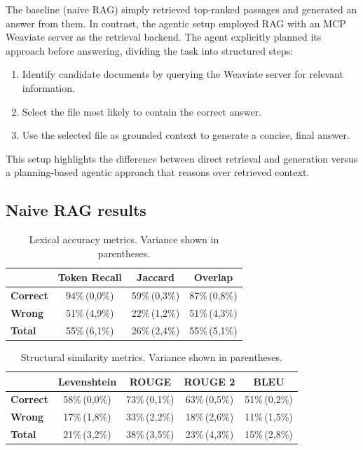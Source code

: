 The baseline (naive RAG) simply retrieved top-ranked passages and generated an answer from them. In contrast, the agentic setup employed RAG with an MCP Weaviate server as the retrieval backend. The agent explicitly planned its approach before answering, dividing the task into structured steps:  
\begin{enumerate}
  \item Identify candidate documents by querying the Weaviate server for relevant information.  
  \item Select the file most likely to contain the correct answer.  
  \item Use the selected file as grounded context to generate a concise, final answer.  
\end{enumerate}

This setup highlights the difference between direct retrieval and generation versus a planning-based agentic approach that reasons over retrieved context.
\subsection{Naive RAG results}
\begin{table}[h]
\centering
\begin{tabular}{lccc}
\hline
 & Token Recall & Jaccard & Overlap \\
\hline
\textbf{Correct} & 94\%\,(0,0\%) & 59\%\,(0,3\%) & 87\%\,(0,8\%) \\
\textbf{Wrong}   & 51\%\,(4,9\%) & 22\%\,(1,2\%) & 51\%\,(4,3\%) \\
\textbf{Total}   & 55\%\,(6,1\%) & 26\%\,(2,4\%) & 55\%\,(5,1\%) \\
\hline
\end{tabular}
\caption{Lexical accuracy metrics. Variance shown in parentheses.}
\end{table}


\begin{table}[h]
\centering
\begin{tabular}{lcccc}
\hline
 & Levenshtein & ROUGE & ROUGE 2 & BLEU \\
\hline
\textbf{Correct} & 58\%\,(0,0\%) & 73\%\,(0,1\%) & 63\%\,(0,5\%) & 51\%\,(0,2\%) \\
\textbf{Wrong}   & 17\%\,(1,8\%) & 33\%\,(2,2\%) & 18\%\,(2,6\%) & 11\%\,(1,5\%) \\
\textbf{Total}   & 21\%\,(3,2\%) & 38\%\,(3,5\%) & 23\%\,(4,3\%) & 15\%\,(2,8\%) \\
\hline
\end{tabular}
\caption{Structural similarity metrics. Variance shown in parentheses.}
\end{table}

